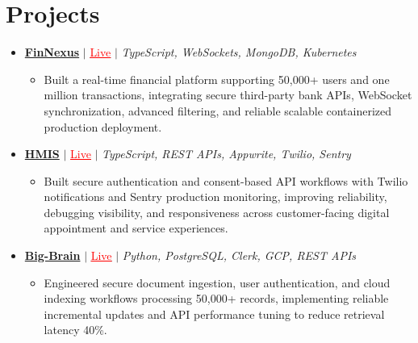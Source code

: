 \documentclass[letterpaper,10pt]{article}
\newcommand{\resumeItem}[1]{\item\small{{#1 \vspace{-2pt}}}}
\newcommand{\resumeProjectHeading}[1]{\item \small #1 \vspace{-2pt}}
\newcommand{\resumeProjectLink}[2]{\href{#1}{\textcolor{red}{\underline{#2}}}}
\newcommand{\resumeSubHeadingListStart}{\begin{itemize}[leftmargin=0.0in,label={}]}
\newcommand{\resumeSubHeadingListEnd}{\end{itemize}}
\newcommand{\resumeProjItemListStart}{\begin{itemize}[leftmargin=0.15in,label=\textbullet,itemsep=0pt,topsep=0pt,parsep=0pt,partopsep=0pt]}
\newcommand{\resumeProjItemListEnd}{\end{itemize}\vspace{1pt}}
\begin{document}
\section{Projects}
\resumeSubHeadingListStart
  \resumeProjectHeading{\href{https://fin-nexus.vercel.app/}{\textbf{FinNexus}} $|$ \resumeProjectLink{https://fin-nexus.vercel.app/}{Live} $|$ \emph{TypeScript, WebSockets, MongoDB, Kubernetes}}
  \resumeProjItemListStart
    \resumeItem{Built a real-time financial platform supporting 50,000+ users and one million transactions, integrating secure third-party bank APIs, WebSocket synchronization, advanced filtering, and reliable scalable containerized production deployment.}
  \resumeProjItemListEnd
  \resumeProjectHeading{\href{https://hims-rouge.vercel.app/}{\textbf{HMIS}} $|$ \resumeProjectLink{https://hims-rouge.vercel.app/}{Live} $|$ \emph{TypeScript, REST APIs, Appwrite, Twilio, Sentry}}
  \resumeProjItemListStart
    \resumeItem{Built secure authentication and consent-based API workflows with Twilio notifications and Sentry production monitoring, improving reliability, debugging visibility, and responsiveness across customer-facing digital appointment and service experiences.}
  \resumeProjItemListEnd
  \resumeProjectHeading{\href{https://big-brain-pied.vercel.app/}{\textbf{Big-Brain}} $|$ \resumeProjectLink{https://big-brain-pied.vercel.app/}{Live} $|$ \emph{Python, PostgreSQL, Clerk, GCP, REST APIs}}
  \resumeProjItemListStart
    \resumeItem{Engineered secure document ingestion, user authentication, and cloud indexing workflows processing 50,000+ records, implementing reliable incremental updates and API performance tuning to reduce retrieval latency 40\%.}
  \resumeProjItemListEnd
\resumeSubHeadingListEnd
\end{document}
